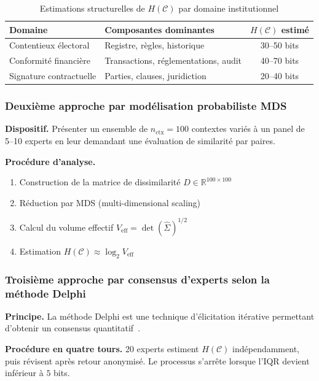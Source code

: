 \begin{sloppypar}
\begin{table}[htbp]
\centering
\caption{Estimations structurelles de $H(\mathcal{C})$ par domaine institutionnel}
\label{tab:estimations_structurelles_HC}
\begin{tabular}{@{}llc@{}}
\toprule
\textbf{Domaine} & \textbf{Composantes dominantes} & $H(\mathcal{C})$ estim\'e \\
\midrule
Contentieux \'electoral & Registre, r\`egles, historique & 30--50 bits \\
Conformit\'e financi\`ere & Transactions, r\'eglementations, audit & 40--70 bits \\
Signature contractuelle & Parties, clauses, juridiction & 20--40 bits \\
\bottomrule
\end{tabular}
\end{table}

\subsubsection{Deuxi\`eme approche par mod\'elisation probabiliste MDS}
\label{subsubsec:approche_MDS}

\noindent\textbf{Dispositif.} Pr\'esenter un ensemble de $n_{\text{ctx}} = 100$
contextes vari\'es \`a un panel de 5--10 experts en leur demandant une
\'evaluation de similarit\'e par paires.

\noindent\textbf{Proc\'edure d'analyse.}
\begin{enumerate}
\item Construction de la matrice de dissimilarit\'e $D \in \mathbb{R}^{100 \times 100}$
\item R\'eduction par MDS (multi-dimensional scaling)
\item Calcul du volume effectif $V_{\mathrm{eff}} = \det(\hat\Sigma)^{1/2}$
\item Estimation $H(\mathcal{C}) \approx \log_2 V_{\mathrm{eff}}$
\end{enumerate}

\subsubsection{Troisi\`eme approche par consensus d'experts selon la m\'ethode Delphi}
\label{subsubsec:approche_delphi}

\noindent\textbf{Principe.} La m\'ethode Delphi est une technique
d'\'elicitation it\'erative permettant d'obtenir un consensus
quantitatif~\cite{MINKA2026CRO}.

\noindent\textbf{Proc\'edure en quatre tours.} 20 experts estiment
$H(\mathcal{C})$ ind\'ependamment, puis r\'evisent apr\`es retour
anonymis\'e. Le processus s'arr\^ete lorsque l'IQR devient inf\'erieur \`a $5$ bits.
\end{sloppypar}

